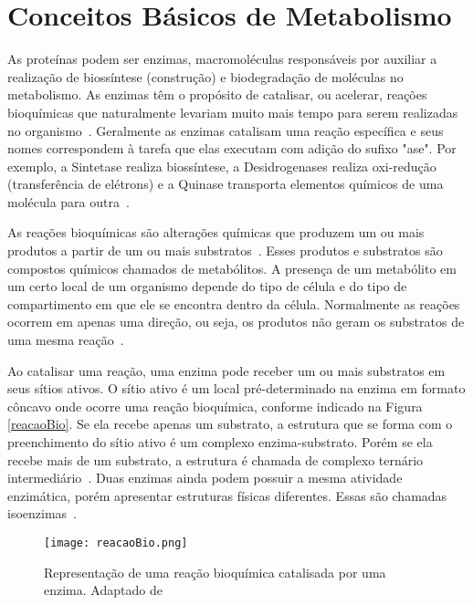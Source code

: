 

\section{Conceitos Básicos de Metabolismo} \label{conceitosMeta}


\indent As proteínas podem ser enzimas, macromoléculas responsáveis por auxiliar a realização de biossíntese (construção) e biodegradação de moléculas no metabolismo. As enzimas têm o propósito de catalisar, ou acelerar, reações bioquímicas que naturalmente levariam muito mais tempo para serem realizadas no organismo~\cite{setubal97}. Geralmente as enzimas catalisam uma reação específica e seus nomes correspondem à tarefa que elas executam com adição do sufixo "ase". Por exemplo, a Sintetase realiza biossíntese, a Desidrogenases realiza oxi-redução (transferência de elétrons) e a Quinase transporta elementos químicos de uma molécula para outra~\cite{enzymesKirk}.

\indent As reações bioquímicas são alterações químicas que produzem um ou mais produtos a partir de um ou mais substratos~\cite{lacroixCTS08}. Esses produtos e substratos são compostos químicos chamados de metabólitos. A presença de um metabólito em um certo local de um organismo depende do tipo de célula e do tipo de compartimento em que ele se encontra dentro da célula. Normalmente as reações ocorrem em apenas uma direção, ou seja, os produtos não geram os substratos de uma mesma reação~\cite{lacroixCTS08}.

\indent Ao catalisar uma reação, uma enzima pode receber um ou mais substratos em seus sítios ativos. O sítio ativo é um local pré-determinado na enzima em formato côncavo onde ocorre uma reação bioquímica, conforme indicado na Figura \ref{reacaoBio}. Se ela recebe apenas um substrato, a estrutura que se forma com o preenchimento do sítio ativo é um complexo enzima-substrato. Porém se ela recebe mais de um substrato, a estrutura é chamada de complexo ternário intermediário~\cite{Cap2schomburg}. Duas enzimas ainda podem possuir a mesma atividade enzimática, porém apresentar estruturas físicas diferentes. Essas são chamadas isoenzimas~\cite{Cap2schomburg}.

\begin{figure}[h]
    \centering
    \texttt{[image: reacaoBio.png]}
    \caption{Representação de uma reação bioquímica catalisada por uma enzima. Adaptado de~\cite{reacaoBioUSP}}
    \label{fig:bioLuz}
\end{figure}

